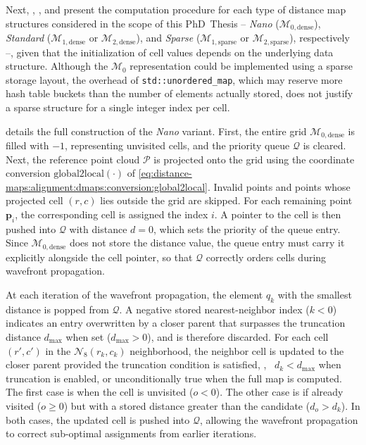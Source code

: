 Next, ,
, and
 present the computation
procedure for each type of distance map structures considered in the scope of
this PhD~Thesis -- \emph{Nano} ($\mathcal{M}_{0,\mathrm{dense}}$), \emph{Standard}
($\mathcal{M}_{1,\mathrm{dense}}$ or $\mathcal{M}_{2,\mathrm{dense}}$), and
\emph{Sparse} ($\mathcal{M}_{1,\mathrm{sparse}}$ or $\mathcal{M}_{2,\mathrm{sparse}}$),
respectively --, given that the initialization of cell values depends on the
underlying data structure.
Although the $\mathcal{M}_0$ representation could be implemented using
a sparse storage layout, the overhead of \texttt{std::unordered\_map},
which may reserve more hash table buckets than
the number of elements actually stored, does not justify a sparse structure for
a single integer index per cell.





 details
the full construction of the \emph{Nano} variant.
First, the entire grid $\mathcal{M}_{0,\mathrm{dense}}$ is filled with $-1$, representing
unvisited cells, and the priority queue $\mathcal{Q}$ is cleared.
Next, the reference point cloud $\mathcal{P}$ is projected onto the grid
using the coordinate conversion $\mathrm{global2local}(\cdot)$ of
\eqref{eq:distance-maps:alignment:dmaps:conversion:global2local}.
Invalid points and points whose projected cell $(r, c)$ lies outside
the grid are skipped. For each remaining point $\mathbf{p}_i$,
the corresponding cell is assigned the index $i$.
A pointer to the cell is then pushed into $\mathcal{Q}$ with distance
$d = 0$, which sets the priority of the queue entry.
Since $\mathcal{M}_{0,\mathrm{dense}}$ does not store the distance value, the queue
entry must carry it explicitly alongside the cell pointer, so that
$\mathcal{Q}$ correctly orders cells during wavefront propagation.

At each iteration of the wavefront propagation, the element $q_k$ with
the smallest distance is popped from $\mathcal{Q}$. A negative stored nearest-neighbor
index ($k < 0$) indicates an entry overwritten by a closer parent that surpasses
the truncation distance $d_{\max}$ when set ($d_{\max} > 0$), and is therefore
discarded. For each cell $(r', c')$ in the $\mathcal{N}_8(r_k, c_k)$
neighborhood, the neighbor cell is updated to the closer parent provided
the truncation condition is satisfied, \ie,
\ $d_k < d_{\max}$ when truncation is enabled, or
unconditionally true when the full map is computed.
The first case is when the cell is unvisited ($o < 0$). The other case is
if already visited ($o \geq 0$) but with a stored distance greater than
the candidate ($d_o > d_k$). In both cases, the updated cell is pushed into
$\mathcal{Q}$, allowing the wavefront propagation to correct sub-optimal
assignments from earlier iterations.

